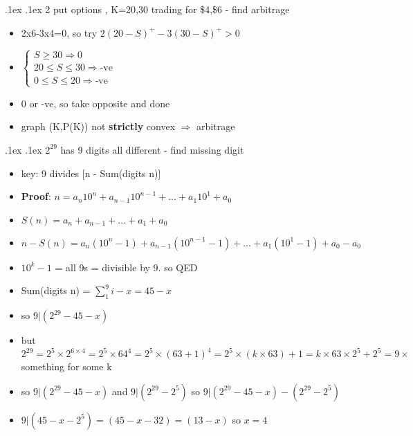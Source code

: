 \documentclass[10pt,landscape,a4paper]{article}
\makeatletter
\renewcommand{\section}{\@startsection{section}{1}{0mm}%
                                {.1ex}%
                                {.1ex}%
                                {\color{blue}\sffamily\small\bfseries}}
\makeatother
\begin{document}
\newcommand{\sucht}{\ \wasytherefore\ }

\pagecolor{light-gray}	
\normalsize

\begin{multicols*}{4}

\begin{spacing}{0.1}
	
\section{2 put options , K=20,30 trading for \$4,\$6 - find arbitrage}
\begin{itemize}
	\item 2x6-3x4=0, so try  $2{(20-S)}^+ - 3{(30-S)}^+ > 0 $
	\item 
	$
	\begin{cases}
		S \ge 30 \Rightarrow 0 \\ 
		20 \le S \le 30 \Rightarrow \text{-ve} \\
		0 \le S \le 20 \Rightarrow \text{-ve}
	\end{cases}
	$
	\item 0 or -ve, so take opposite and done	
	\item graph (K,P(K)) not \textbf{strictly} convex $\Rightarrow$ arbitrage
	
	
\end{itemize}



\section{$2^{29}$ has 9 digits all different - find missing digit}
\begin{itemize}
\item key: 9 divides [n - Sum(digits n)]
\item \textbf{Proof}: $n=a_n 10^n + a_{n-1} 10^{n-1}+ \ldots + a_{1} 10^{1} + a_0 $
\item $S(n)=a_n + a_{n-1}+ \ldots + a_{1} + a_0 $
\item $n-S(n)=a_n (10^n-1) + a_{n-1} (10^{n-1}-1)+ \ldots + a_{1} (10^1-1) + a_0-a_0 $
\item $10^k-1$ = all 9s = divisible by 9. so  QED
\item Sum(digits n) = $\sum_{1}^{9}i-x=45-x$
\item so $9|(2^{29}-45-x)$ 
\item but $2^{29}=2^5 \times 2^{6 \times 4} = 2^5 \times {64}^4= 2^5 \times {(63+1)}^4=2^5 \times {(k \times 63)+1}=k \times 63 \times 2^5+2^5 = 9 \times$ something for some k
\item so $9|(2^{29}-45-x)$ and $9|(2^{29}-2^5)$ so $9|(2^{29}-45-x)-(2^{29}-2^5)$
\item $9|(45-x-2^5)=(45-x-32)=(13-x)$ so $x=4$
\end{itemize}


\end{spacing}
\end{multicols*}
\end{document}

